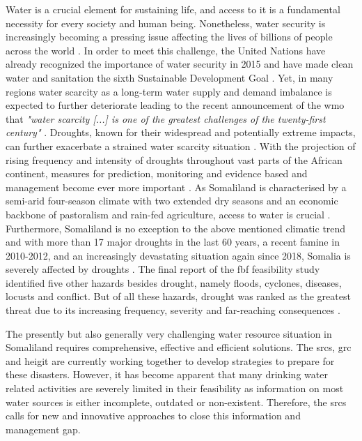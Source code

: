 Water is a crucial element for sustaining life, and access to it is a fundamental necessity for every society and human being. Nonetheless, water security is increasingly becoming a pressing issue affecting the lives of billions of people across the world \autocite{caretta2022water}. In order to meet this challenge, the United Nations have already recognized the importance of water security in 2015 and have made clean water and sanitation the sixth Sustainable Development Goal \autocite{unGoalEnsureAvailability2016}. Yet, in many regions water scarcity as a long-term water supply and demand imbalance is expected to further deteriorate leading to the recent announcement of the \acrlong{wmo} that \textit{"water scarcity [...] is one of the greatest challenges of the twenty-first century"} \autocite[7]{idmpDroughtWaterScarcity2022}.\newline
Droughts, known for their widespread and potentially extreme impacts, can further exacerbate a strained water scarcity situation \autocite{idmpDroughtWaterScarcity2022}. With the projection of rising frequency and intensity of droughts throughout vast parts of the African continent, measures for prediction, monitoring and evidence based  and management become ever more important \autocite{abdulkadirAssessmentDroughtRecurrence2017,trisosAfrica2022,undrrSpecialReportDrought2021}.\newline
As Somaliland is characterised by a semi-arid four-season climate with two extended dry seasons and an economic backbone of pastoralism and rain-fed agriculture, access to water is crucial \autocite{abdulkadirAssessmentDroughtRecurrence2017,petrucciLandscapeLandformsNorthern2022,republicofsomaliaRepublicSomalilandCountry2021}. Furthermore, Somaliland is no exception to the above mentioned climatic trend and with more than 17 major droughts in the last 60 years, a recent famine in 2010-2012, and an increasingly devastating situation again since 2018, Somalia is severely affected by droughts \autocite{abdulkadirAssessmentDroughtRecurrence2017,credEMDATInternationalDisasters2023}. The final report of the \acrfull{fbf} feasibility study identified five other hazards besides drought, namely floods, cyclones, diseases, locusts and conflict. But of all these hazards, drought was ranked as the greatest threat due to its increasing frequency, severity and far-reaching consequences \autocite{scrsFeasibilityStudyPotential2022}.\newline

The presently but also generally very challenging water resource situation in Somaliland requires comprehensive, effective and efficient solutions. The \acrfull{srcs}, \acrfull{grc} and \acrfull{heigit} are currently working together to develop strategies to prepare for these disasters. However, it has become apparent that many drinking water related activities are severely limited in their feasibility as information on most water sources is either incomplete, outdated or non-existent. Therefore, the \acrshort{srcs} calls for new and innovative approaches to close this information and management gap.

